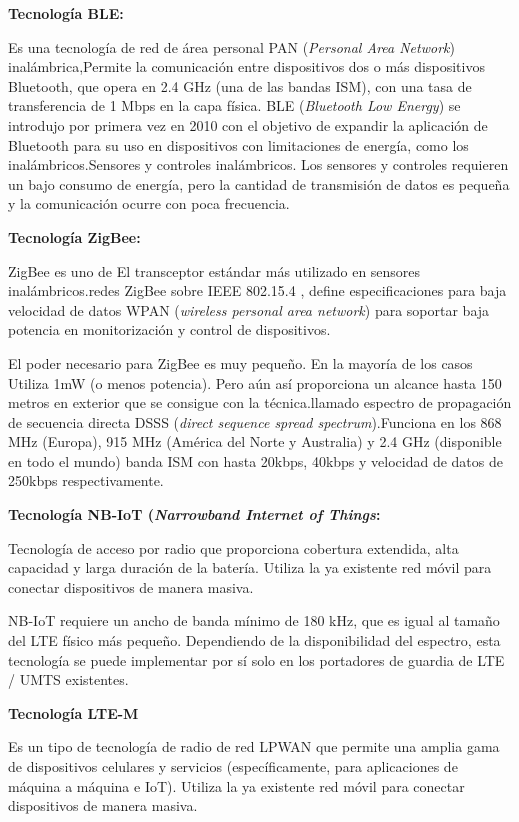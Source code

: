 \textbf{Tecnología BLE:}

Es una tecnología de red de área personal PAN (\textit{Personal Area Network}) inalámbrica,Permite la comunicación entre dispositivos dos o  más dispositivos Bluetooth, que opera en 2.4 GHz (una de las bandas ISM), con una tasa de transferencia de 1 Mbps en la capa física. BLE (\textit{Bluetooth Low Energy}) se introdujo por primera vez en 2010 con el objetivo de expandir la aplicación de Bluetooth para su uso en dispositivos con limitaciones de energía, como los inalámbricos.Sensores y controles inalámbricos. Los sensores y controles requieren un bajo consumo de energía, pero la cantidad de transmisión de datos es pequeña y la comunicación ocurre con poca frecuencia\citep{chang2014bluetooth}.


\textbf{Tecnología ZigBee:}

ZigBee es uno de El transceptor estándar más utilizado en sensores inalámbricos.redes ZigBee sobre IEEE 802.15.4 , define especificaciones para baja velocidad de datos WPAN (\textit{wireless personal area network}) para soportar baja potencia en monitorización y control de dispositivos\citep{ramya2011study}.

El poder necesario para ZigBee es muy pequeño. En la mayoría de los casos Utiliza 1mW (o menos potencia). Pero aún así proporciona un alcance hasta 150 metros en exterior que se consigue con la técnica.llamado espectro de propagación de secuencia directa DSSS (\textit{direct sequence spread spectrum}).Funciona en los 868 MHz (Europa), 915 MHz (América del Norte y Australia) y 2.4 GHz (disponible en todo el mundo) banda ISM con hasta 20kbps, 40kbps y velocidad de datos de 250kbps respectivamente\citep{ramya2011study}.

\textbf{Tecnología NB-IoT (\textit{Narrowband Internet of Things}:}

Tecnología de acceso por radio que proporciona cobertura extendida, alta capacidad y larga duración de la batería. Utiliza la ya existente red móvil para conectar dispositivos de manera masiva.

NB-IoT requiere un ancho de banda mínimo de 180 kHz, que es igual al tamaño del LTE físico más pequeño.
Dependiendo de la disponibilidad del espectro, esta tecnología se puede implementar por sí solo en los portadores de guardia de LTE / UMTS existentes\citep{adhikary2016performance}.

\textbf{Tecnología LTE-M}

Es un tipo de tecnología de radio de red LPWAN que permite una amplia gama de dispositivos celulares y servicios (específicamente, para aplicaciones de máquina a máquina e IoT). Utiliza la ya existente red móvil para conectar dispositivos de manera masiva.


